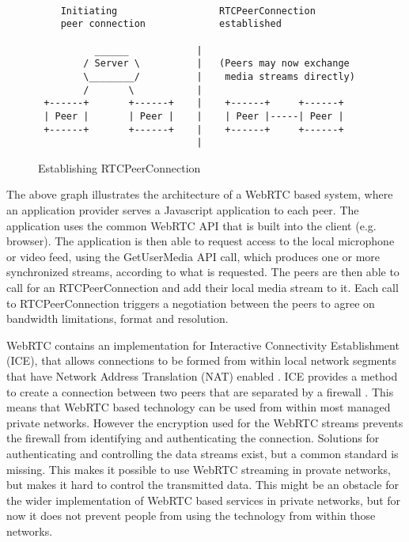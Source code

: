 \documentclass[english,12pt,a4paper,dvips]{article}
\begin{document}
\begin{figure}
\begin{verbatim}

    Initiating                  RTCPeerConnection
    peer connection             established
    
          ______            |
        / Server \          |   (Peers may now exchange 
        \________/          |    media streams directly)
        /       \           |
 +------+       +------+    |    +------+     +------+
 | Peer |       | Peer |    |    | Peer |-----| Peer |
 +------+       +------+    |    +------+     +------+
                            |
\end{verbatim}
\caption{Establishing RTCPeerConnection}
\label{fig:peer-connection}
\end{figure}

The above graph illustrates the architecture of a WebRTC based system, where an application provider serves a Javascript application to each peer. The application uses the common WebRTC API that is built into the client (e.g. browser). The application is then able to request access to the local microphone or video feed, using the GetUserMedia API call, which produces one or more synchronized streams, according to what is requested. The peers are then able to call for an RTCPeerConnection and add their local media stream to it. Each call to RTCPeerConnection triggers a negotiation between the peers to agree on bandwidth limitations, format and resolution. \cite{Jennings} \cite{Garaizar}

WebRTC contains an implementation for Interactive Connectivity Establishment (ICE), that allows connections to be formed from within local network segments that have Network Address Translation (NAT) enabled \cite{Jennings} \cite{Johnston}. ICE provides a method to create a connection between two peers that are separated by a firewall \cite{Rosenberg}. This means that WebRTC based technology can be used from within most managed private networks. However the encryption used for the WebRTC streams prevents the firewall from identifying and authenticating the connection. Solutions for authenticating and controlling the data streams exist, but a common standard is missing. This makes it possible to use WebRTC streaming in provate networks, but makes it hard to control the transmitted data. \cite{Johnston} This might be an obstacle for the wider implementation of WebRTC based services in private networks, but for now it does not prevent people from using the technology from within those networks.
\end{document}
